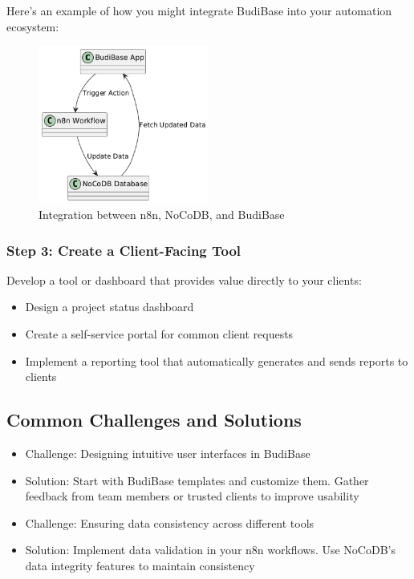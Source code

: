 Here's an example of how you might integrate BudiBase into your automation ecosystem:


\begin{figure}
    \centering
    \includegraphics[width=0.5\textwidth]{figures/09-n8n-budibase-nocodb}
    \caption{Integration between n8n, NoCoDB, and BudiBase}
    \label{fig:n8n-budibase-nocodb-integration}
\end{figure}

\subsubsection{Step 3: Create a Client-Facing Tool}
Develop a tool or dashboard that provides value directly to your clients:

\begin{itemize}
    \item Design a project status dashboard
    \item Create a self-service portal for common client requests
    \item Implement a reporting tool that automatically generates and sends reports to clients
\end{itemize}

\subsection{Common Challenges and Solutions}
\begin{itemize}
    \item Challenge: Designing intuitive user interfaces in BudiBase
    \item Solution: Start with BudiBase templates and customize them. Gather feedback from team members or trusted clients to improve usability

    \item Challenge: Ensuring data consistency across different tools
    \item Solution: Implement data validation in your n8n workflows. Use NoCoDB's data integrity features to maintain consistency
\end{itemize}

